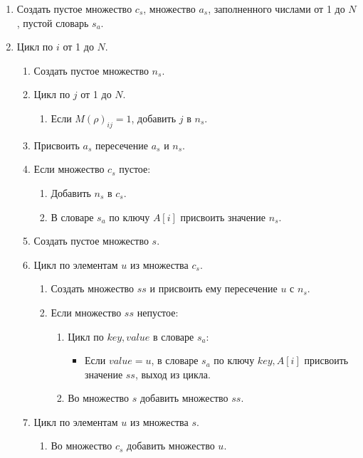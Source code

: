 \documentclass[bachelor, och, labwork]{shiza}
\begin{document}
\begin{enumerate}
    \item Создать пустое множество $c_s$, множество $a_s$, заполненного числами
    от 1 до $N$, пустой словарь $s_a$.
    \item Цикл по $i$ от 1 до $N$.
        \begin{enumerate}
            \item Создать пустое множество $n_s$.
            \item Цикл по $j$ от 1 до $N$.
                \begin{enumerate}\item Если $M(\rho)_{ij}=1$, добавить $j$ в $n_s$.\end{enumerate}
            \item Присвоить $a_s$ пересечение $a_s$ и $n_s$.
            \item Если множество $c_s$ пустое:
                \begin{enumerate}
                \item Добавить $n_s$ в $c_s$.
                \item В словаре $s_a$ по ключу $A[i]$ присвоить значение $n_s$. 
                \end{enumerate} 
            \item Создать пустое множество $s$.
            \item Цикл по элементам $u$ из множества $c_s$.
                \begin{enumerate}
                    \item Создать множество $ss$ и присвоить ему пересечение 
                    $u$ с $n_s$.
                    \item Если множество $ss$ непустое:
                        \begin{enumerate}
                            \item Цикл по $key,value$ в словаре $s_a$:
                                \begin{itemize}
                                    \item Если $value=u$, в словаре $s_a$ по ключу $key, A[i]$ присвоить значение $ss$, выход из цикла.
                                \end{itemize}
                            \item Во множество $s$ добавить множество $ss$.
                        \end{enumerate}
                \end{enumerate}
           \item Цикл по элементам $u$ из множества $s$.
                \begin{enumerate}\item Во множество $c_s$ добавить множество $u$.\end{enumerate}
            

\end{enumerate}
\end{enumerate}
\end{document}
